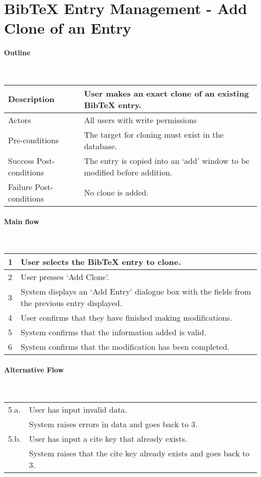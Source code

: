 \section*{BibTeX Entry Management - Add Clone of an Entry} %

\paragraph*{Outline} \

\begin{tabular}{ | l | l | }
\hline
Description & User makes an exact clone of an existing BibTeX entry. \\ \hline
Actors & All users with write permissions \\ \hline
Pre-conditions & The target for cloning must exist in the database. \\ \hline
Success Post-conditions & The entry is copied into an `add' window to be modified before addition. \\ \hline
Failure Post-conditions & No clone is added. \\ \hline
\end{tabular}


\paragraph*{Main flow} \

\begin{tabular}{ | l | l | } \hline
1 & User selects the BibTeX entry to clone. \\ \hline
2 & User presses `Add Clone'. \\ \hline
3 & System displays an `Add Entry' dialogue box with the fields from the previous entry displayed. \\ \hline
4 & User confirms that they have finished making modifications. \\ \hline
5 & System confirms that the information added is valid. \\ \hline
6 & System confirms that the modification has been completed. \\ \hline
\end{tabular}


\paragraph*{Alternative Flow} \

\begin{tabular}{ | l | l | } \hline
5.a. & User has input invalid data. \\
     & System raises errors in data and goes back to 3. \\ \hline
5.b. & User has input a cite key that already exists. \\
     & System raises that the cite key already exists and goes back to 3. \\ \hline
\end{tabular}